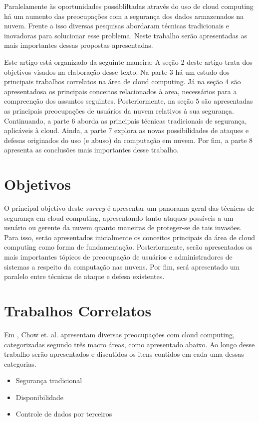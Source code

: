 \documentclass[brazil,12pt]{article}
\begin{document}
Paralelamente às oportunidades possibliltadas através do uso de cloud computing
há um aumento das preocupações com a segurança dos dados armazenados na nuvem.
Frente a isso diversas pesquisas abordaram técnicas tradicionais e inovadoras
para solucionar esse problema. Neste trabalho serão apresentadas as mais
importantes dessas propostas apresentadas.

Este artigo está organizado da seguinte maneira: A seção 2 deste artigo trata
dos objetivos visados na elaboração desse texto. Na parte 3 há um estudo dos
principais trabalhos correlatos na área de cloud computing. Já na seção 4 são
apresentadosa os principais conceitos relacionados à area, necessários para a
compreenção dos assuntos seguintes. Posteriormente, na seção 5 são apresentadas
as principais preocupações de usuários da nuvem relativos à sua segurança.
Continuando, a parte 6 aborda as principais técnicas tradicionais de segurança,
aplicáveis à cloud. Ainda, a parte 7 explora as novas possibilidades de ataques
e defesas originados do uso (e abuso) da computação em nuvem. Por fim, a parte 8
apresenta as conclusões mais importantes desse trabalho.

\section{Objetivos}
O principal objetivo deste \emph{survey} é apresentar um panorama geral das
técnicas de segurança em cloud computing, apresentando tanto ataques possíveis a
um usuário ou gerente da nuvem quanto maneiras de proteger-se de tais invasões.
Para isso, serão apresentados inicialmente os conceitos principais da área
de cloud computing como forma de fundamentação. Posteriormente, serão
apresentados os mais importantes tópicos de preocupação de usuários e
administradores de sistemas a respeito da computação nas nuvens. Por fim, será
apresentado um paralelo entre técnicas de ataque e defesa existentes.

\section{Trabalhos Correlatos}

Em \cite{controlling-data-in-cloud}, Chow et. al. apresentam diversas
preocupações com cloud computing, categorizadas segundo três macro áreas, como
apresentado abaixo. Ao longo desse trabalho serão apresentados e discutidos os
itens contidos em cada uma dessas categorias.
\begin{itemize}
  \item Segurança tradicional
  \item Disponibilidade
  \item Controle de dados por terceiros
\end{itemize}
\end{document}

